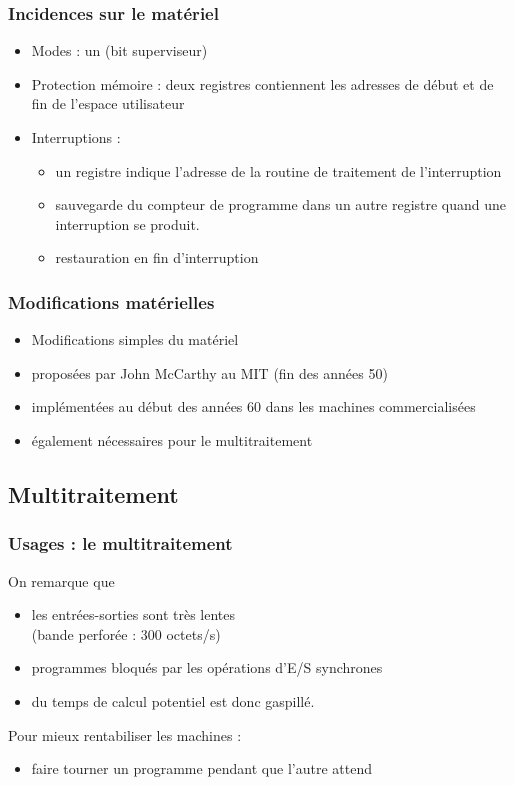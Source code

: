 \documentclass{beamer}
\begin{document}
\begin{frame}
\frametitle{Incidences sur le matériel}

\begin{itemize}
\item \alert{Modes} : un  (\alert{bit superviseur}) 
\item \alert{Protection mémoire} : deux registres contiennent  les adresses de début et de fin de l'espace utilisateur
\item \alert{Interruptions} : 
\begin{itemize}
\item un registre  indique l'\alert{adresse de la
routine de traitement de l'interruption}
\item sauvegarde du compteur de programme dans un autre registre quand
une interruption se produit.
\item restauration en fin d'interruption
\end{itemize}
\end{itemize}
\end{frame}

\begin{frame}
\frametitle{Modifications matérielles}

\begin{itemize}
\item Modifications simples du matériel
\item proposées par John McCarthy au MIT (fin des années 50)
\item implémentées au début des années 60 dans les machines commercialisées
\item également nécessaires pour le multitraitement
\end{itemize}
\end{frame}

\subsection{Multitraitement}
\begin{frame}
\frametitle{Usages : le multitraitement}

On remarque que
\begin{itemize}
\item les entrées-sorties sont \alert{très lentes} \\
(bande perforée : 300 octets/s)
\item programmes bloqués par les opérations d'E/S \alert{synchrones}
\item du temps de calcul potentiel est donc gaspillé.
\end{itemize}
\vfill
Pour mieux rentabiliser les machines :
\begin{itemize}
\item faire tourner un programme pendant que l'autre attend
\end{itemize}
\end{frame}
\end{document}
